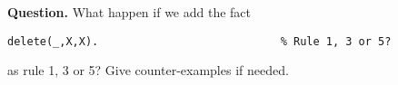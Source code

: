     \noindent\textbf{Question.} What happen if we add the fact 
{\small
\begin{verbatim}
delete(_,X,X).                            % Rule 1, 3 or 5?
\end{verbatim}
}
    \noindent as rule 1, 3 or 5? Give counter-examples if needed.

